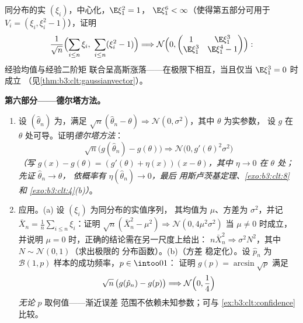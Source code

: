 \begin{problem}
\begin{enumerate}[resume]
        同分布的实 $(\xi_i)$，中心化，$\E\xi_1^2 = 1$，
        $\E\xi_1^6 < \infty$（使得第五部分可用于
        $V_i = (\xi_i, \xi_i^2 - 1)$），证明
        \[
        \frac1{\sqrt n}\Bigl(\sum_{i\leq n}\xi_i,\
        \sum_{i\leq n}(\xi_i^2 - 1)\Bigr) \Longrightarrow
        \mathcal N\Bigl(0, \begin{pmatrix} 1 & \E\xi_1^3\\
        \E\xi_1^3 & \E\xi_1^4 - 1\end{pmatrix}\Bigr) :
        \]
        经验均值与经验二阶矩
        联合呈高斯涨落——在极限下相互，当且仅当
        $\E\xi_1^3 = 0$ 时成立
        （见\cref{thm:b3:clt:gaussianvector}）。
\end{enumerate}

\medskip
\noindent\textbf{第六部分——德尔塔方法。}
\begin{enumerate}[resume]
  \item 设 $(\hat\theta_n)$ 为，满足
        $\sqrt n(\hat\theta_n - \theta) \Rightarrow
        \mathcal N(0, \sigma^2)$，其中 $\theta$ 为实参数，
        设 $g$ 在
        $\theta$ 处可导。证明\emph{德尔塔方法}：
        \[
        \sqrt n\bigl(g(\hat\theta_n) - g(\theta)\bigr)
        \Longrightarrow \mathcal N\bigl(0,
        g'(\theta)^2\sigma^2\bigr)
        \]
        \emph{（写 $g(x) - g(\theta) = (g'(\theta) +
        \eta(x))(x - \theta)$，其中 $\eta \to 0$ 在
        $\theta$ 处；先证 $\hat\theta_n \to \theta$，
        依概率有 $\eta(\hat\theta_n) \to 0$，最后
        用斯卢茨基定理、\cref{exo:b3:clt:8} 和
        \cref{exo:b3:clt:4}(b)）}。
  \item 应用。(a) 设 $(\xi_i)$ 为同分布的实值序列，
        其均值为 $\mu$、方差为 $\sigma^2$，并记 $\bar X_n =
        \frac1n\sum_{i\leq n}\xi_i$：证明 $\sqrt n(\bar
        X_n^2 - \mu^2) \Rightarrow \mathcal N(0,
        4\mu^2\sigma^2)$ 当 $\mu \neq 0$ 时成立，并说明
        $\mu = 0$ 时，正确的结论需在另一尺度上给出：
        $n\bar X_n^2 \Rightarrow \sigma^2N^2$，其中
        $N \sim \mathcal N(0,1)$（求出极限的
        分布函数）。(b)（方差
        稳定化）。设 $\hat p_n$ 为
        $\mathcal B(1, p)$ 样本的成功频率，$p \in \intoo01$：
        证明 $g(p) = \arcsin\sqrt p$ 满足
        \[
        \sqrt n\,\bigl(g(\hat p_n) - g(p)\bigr)
        \Longrightarrow \mathcal N\Bigl(0, \frac14\Bigr)
        \]
        \emph{无论} $p$ 取何值——渐近误差
        范围不依赖未知参数；可与
        \cref{ex:b3:clt:confidence} 比较。
\end{enumerate}


\end{problem}
